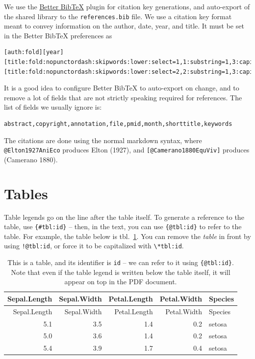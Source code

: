 \documentclass[10pt,oneside]{article}
\begin{document}
We use the \href{https://retorque.re/zotero-better-bibtex/}{Better
BibTeX} plugin for citation key generations, and auto-export of the
shared library to the \texttt{references.bib} file. We use a citation
key format meant to convey information on the author, date, year, and
title. It must be set in the Better BibTeX preferences as

\begin{verbatim}
[auth:fold][year][title:fold:nopunctordash:skipwords:lower:select=1,1:substring=1,3:capitalize][title:fold:nopunctordash:skipwords:lower:select=2,2:substring=1,3:capitalize]
\end{verbatim}

It is a good idea to configure Better BibTeX to auto-export on change,
and to remove a lot of fields that are not strictly speaking required
for references. The list of fields we usually ignore is:

\begin{verbatim}
abstract,copyright,annotation,file,pmid,month,shorttitle,keywords
\end{verbatim}

The citations are done using the normal markdown syntax, where
\texttt{@Elton1927AniEco} produces Elton (1927), and
\texttt{{[}@Camerano1880EquViv{]}} produces (Camerano 1880).

\hypertarget{tables}{%
\section{Tables}\label{tables}}

Table legends go on the line after the table itself. To generate a
reference to the table, use \texttt{\{\#tbl:id\}} -- then, in the text,
you can use \texttt{\{@tbl:id\}} to refer to the table. For example, the
table below is tbl.~\ref{tbl:id}. You can remove the \emph{table} in
front by using \texttt{!@tbl:id}, or force it to be capitalized with
\texttt{\textbackslash{}*tbl:id}.

\hypertarget{tbl:id}{}
\begin{longtable}[]{@{}rrrrl@{}}
\caption{\label{tbl:id}This is a table, and its identifier is
\texttt{id} -- we can refer to it using \texttt{\{@tbl:id\}}. Note that
even if the table legend is written below the table itself, it will
appear on top in the PDF document.}\tabularnewline
\toprule
Sepal.Length & Sepal.Width & Petal.Length & Petal.Width &
Species\tabularnewline
\midrule
\endfirsthead
\toprule
Sepal.Length & Sepal.Width & Petal.Length & Petal.Width &
Species\tabularnewline
\midrule
\endhead
5.1 & 3.5 & 1.4 & 0.2 & setosa\tabularnewline
5.0 & 3.6 & 1.4 & 0.2 & setosa\tabularnewline
5.4 & 3.9 & 1.7 & 0.4 & setosa\tabularnewline
\bottomrule
\end{longtable}
\end{document}
